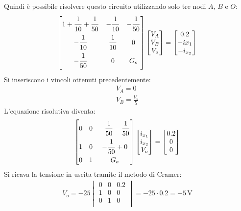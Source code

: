 \documentclass{article}
\begin{document}
Quindi è possibile risolvere questo circuito utilizzando solo tre nodi $A$, $B$ e $O$:
\begin{gather*}
    \begin{bmatrix}
        1+\displaystyle\frac{\strut1}{\strut 10}+\frac{\strut 1}{\strut 50}&-\displaystyle\frac{\strut 1}{\strut 10}&-\displaystyle\frac{\strut 1}{\strut 50}\\
        -\displaystyle\frac{\strut 1}{\strut 10}&\displaystyle\frac{\strut1}{\strut10}&0\\
        -\displaystyle\frac{\strut 1}{\strut 50}&0&G_o\\
    \end{bmatrix}\begin{bmatrix}
        V_A\\V_B\\V_o
    \end{bmatrix}=\begin{bmatrix}
        0.2\\-i{x_1}\\-i_{x_2}
    \end{bmatrix}
\end{gather*}
Si inseriscono i vincoli ottenuti precedentemente:
\begin{gather*}
    V_A=0\\
    V_B=\displaystyle\frac{V_o}{5}
\end{gather*}
L'equazione risolutiva diventa:
\begin{gather*}
    \begin{bmatrix}
        0&0&-\displaystyle\frac{\strut 1}{\strut 50}-\frac{\strut 1}{\strut 50}\\
        1&0&-\displaystyle\frac{\strut 1}{\strut 50}+0\\
        0&1&G_o\\
    \end{bmatrix}\begin{bmatrix}
        i_{x_1}\\i_{x_2}\\V_o
    \end{bmatrix}=\begin{bmatrix}
        0.2\\0\\0
    \end{bmatrix}
\end{gather*}
Si ricava la tensione in uscita tramite il metodo di Cramer:
\begin{gather}
    V_o=-25\begin{vmatrix}
        0&0&0.2\\
        1&0&0\\
        0&1&0\\
    \end{vmatrix}=-25\cdot0.2=-5\,\mathrm{V}
\end{gather}
\end{document}

